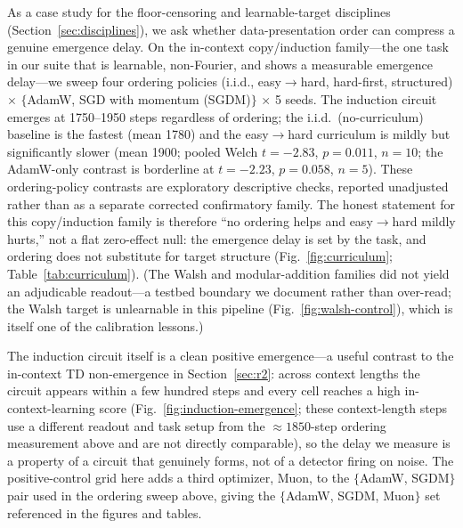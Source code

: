 \documentclass[11pt]{article}
\theoremstyle{plain}
\theoremstyle{definition}
\begin{document}
As a case study for the floor-censoring and learnable-target disciplines
(Section~\ref{sec:disciplines}), we ask whether data-presentation order can compress a
genuine emergence delay.
On the in-context copy/induction family---the one task in our suite that is learnable,
non-Fourier, and shows a measurable emergence delay---we sweep four ordering policies
(i.i.d., easy$\to$hard, hard-first, structured) $\times$ $\{$AdamW, SGD with momentum
(SGDM)$\}$ $\times$ 5 seeds.
The induction circuit emerges at 1750--1950 steps regardless of ordering; the i.i.d.\
(no-curriculum) baseline is the fastest (mean 1780) and the easy$\to$hard
curriculum is mildly but significantly slower (mean 1900; pooled Welch
$t = -2.83$, $p = 0.011$, $n = 10$; the AdamW-only contrast is borderline at $t = -2.23$,
$p = 0.058$, $n = 5$). These ordering-policy contrasts are exploratory descriptive checks,
reported unadjusted rather than as a separate corrected confirmatory family. The honest
statement for this copy/induction family is therefore ``no
ordering helps and easy$\to$hard mildly hurts,'' not a flat zero-effect null: the
emergence delay is set by the task, and ordering does not substitute for target structure
(Fig.~\ref{fig:curriculum}; Table~\ref{tab:curriculum}). (The Walsh and modular-addition families did not yield an
adjudicable readout---a testbed boundary we document rather than over-read; the Walsh
target is unlearnable in this pipeline (Fig.~\ref{fig:walsh-control}), which is itself one
of the calibration lessons.)

The induction circuit itself is a clean positive emergence---a useful contrast to the
in-context TD non-emergence in Section~\ref{sec:r2}: across context lengths the circuit appears within
a few hundred steps and every cell reaches a high in-context-learning score
(Fig.~\ref{fig:induction-emergence}; these context-length steps use a different readout and
task setup from the ${\approx}1850$-step ordering measurement above and are not directly
comparable), so the delay we measure is a property of a circuit
that genuinely forms, not of a detector firing on noise. The positive-control grid here
adds a third optimizer, Muon, to the
$\{$AdamW, SGDM$\}$ pair used in the ordering sweep above, giving the
$\{$AdamW, SGDM, Muon$\}$ set referenced in the figures and tables.
\end{document}
